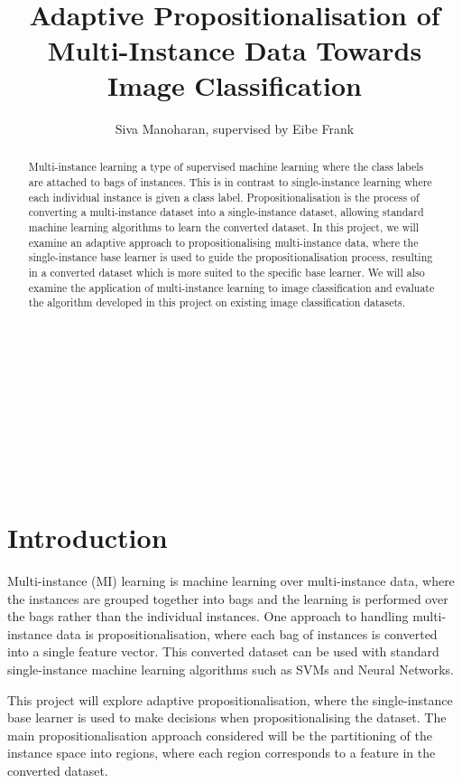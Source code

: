 \documentclass[a4paper,12pt]{article} %
\title{\ \\ \  \\ Adaptive Propositionalisation of Multi-Instance Data Towards Image Classification}
\author{Siva Manoharan, supervised by Eibe Frank}
\begin{document}

\maketitle 
\ \\ \ \\ \ \\ \ \\ \ \\ \ \\ \ %
\begin{abstract}
Multi-instance learning a type of supervised machine learning where the class labels are attached to bags of instances. This is in contrast to single-instance learning where each individual instance is given a class label.
Propositionalisation is the process of converting a multi-instance dataset into a single-instance dataset, allowing standard machine learning algorithms to learn the converted dataset. 
In this project, we will examine an adaptive approach to propositionalising multi-instance data, where the single-instance base learner is used to guide the propositionalisation process, resulting in a converted dataset which is more suited to the specific base learner.
We will also examine the application of multi-instance learning to image classification and evaluate the algorithm developed in this project on existing image classification datasets.
\end{abstract}

\thispagestyle{empty}

\clearpage
{}  

\section{Introduction} 

Multi-instance (MI) learning is machine learning over multi-instance data, where the instances are grouped together into bags and the learning is performed over the bags rather than the individual instances. One approach to handling multi-instance data is propositionalisation, where each bag of instances is converted into a single feature vector. This converted dataset can be used with standard single-instance machine learning algorithms such as SVMs and Neural Networks.

This project will explore adaptive propositionalisation, where the single-instance base learner is used to make decisions when propositionalising the dataset. The main propositionalisation approach considered will be the partitioning of the instance space into regions, where each region corresponds to a feature in the converted dataset.
    
\end{document}
